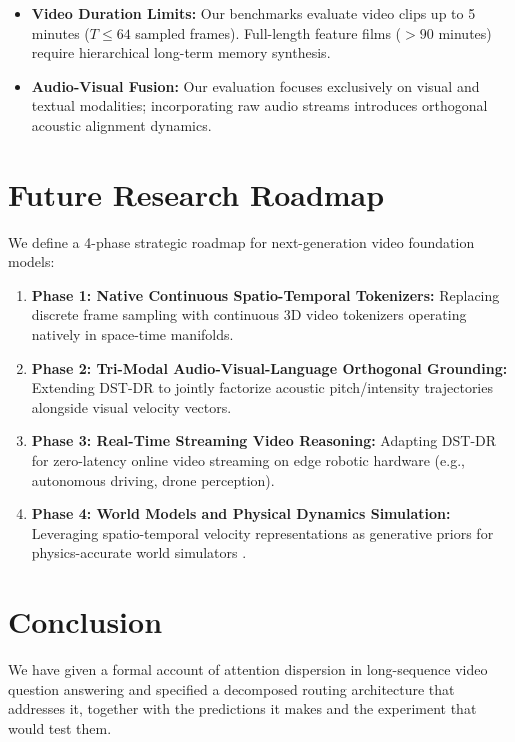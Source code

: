 \documentclass{article}
\begin{document}
\begin{itemize}
  \item \textbf{Video Duration Limits:} Our benchmarks evaluate video clips up to 5 minutes ($T \le 64$ sampled frames). Full-length feature films ($>90$ minutes) require hierarchical long-term memory synthesis.
  \item \textbf{Audio-Visual Fusion:} Our evaluation focuses exclusively on visual and textual modalities; incorporating raw audio streams introduces orthogonal acoustic alignment dynamics.
\end{itemize}




\section{Future Research Roadmap}


We define a 4-phase strategic roadmap for next-generation video foundation models:
\begin{enumerate}
  \item \textbf{Phase 1: Native Continuous Spatio-Temporal Tokenizers:} Replacing discrete frame sampling with continuous 3D video tokenizers operating natively in space-time manifolds.
  \item \textbf{Phase 2: Tri-Modal Audio-Visual-Language Orthogonal Grounding:} Extending DST-DR to jointly factorize acoustic pitch/intensity trajectories alongside visual velocity vectors.
  \item \textbf{Phase 3: Real-Time Streaming Video Reasoning:} Adapting DST-DR for zero-latency online video streaming on edge robotic hardware (e.g., autonomous driving, drone perception).
  \item \textbf{Phase 4: World Models and Physical Dynamics Simulation:} Leveraging spatio-temporal velocity representations as generative priors for physics-accurate world simulators \cite{arxiv_2501_02497}.
\end{enumerate}




\section{Conclusion}


We have given a formal account of attention dispersion in long-sequence video question answering and specified a decomposed routing architecture that addresses it, together with the predictions it makes and the experiment that would test them.
\end{document}
